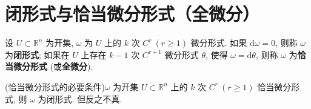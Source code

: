 
\section{闭形式与恰当微分形式（全微分）}

\begin{definition}\label{def:11.5.1}

设 $U\subset\mathbb{R}^{n}$ 为开集, $\omega$ 为 $U$ 上的 $k$ 次 $C^{r}\ (r\geqslant1)$ 微分形式. 如果 $\mathrm{d}\omega=0$, 则称 $\omega$ 为\textbf{闭形式}; 如果在 $U$ 上存在 $k-1$ 次 $C^{r+1}$ 微分形式 $\theta$, 使得 $\omega=\mathrm{d}\theta$, 则称 $\omega$ 为\textbf{恰当微分形式} (或\textbf{全微分}).

\end{definition}

\begin{theorem}\label{thm:11.5.1}

(恰当微分形式的必要条件)$\omega$ 为开集 $U\subset\mathbb{R}^{n}$ 上的 $k$ 次 $C^{r}\ (r\geqslant1)$ 恰当微分形式, 则 $\omega$ 为闭形式. 但反之不真.

\end{theorem}

